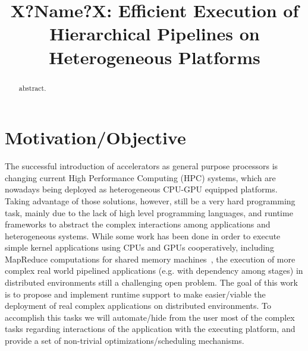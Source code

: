 \documentclass{sig-alternate}
\begin{document}
%

\title{X?Name?X: Efficient Execution of Hierarchical Pipelines on Heterogeneous Platforms}
\sloppy

\maketitle
\begin{abstract}
%
abstract.
%
\end{abstract}

\section{Motivation/Objective}

The successful introduction of accelerators as general purpose processors is
changing current High Performance Computing (HPC) systems, which are nowadays
being deployed as heterogeneous CPU-GPU equipped platforms. Taking advantage of
those solutions, however, still be a very hard programming task, mainly due to
the lack of high level programming languages, and runtime frameworks to
abstract the complex interactions among applications and heterogeneous systems.
While some work has been done in order to execute simple kernel applications
using CPUs and GPUs cooperatively, including MapReduce computations for shared
memory machines~\cite{mars,merge,qilin09luk}, the execution of more complex
real world pipelined applications (e.g. with dependency among stages) in
distributed environments still a challenging open problem. The goal of this
work is to propose and implement runtime support to make easier/viable the
deployment of real complex applications on distributed environments. To
accomplish this tasks we will automate/hide from the user most of the complex
tasks regarding interactions of the application with the executing platform,
and provide a set of non-trivial optimizations/scheduling mechanisms.
\end{document}
